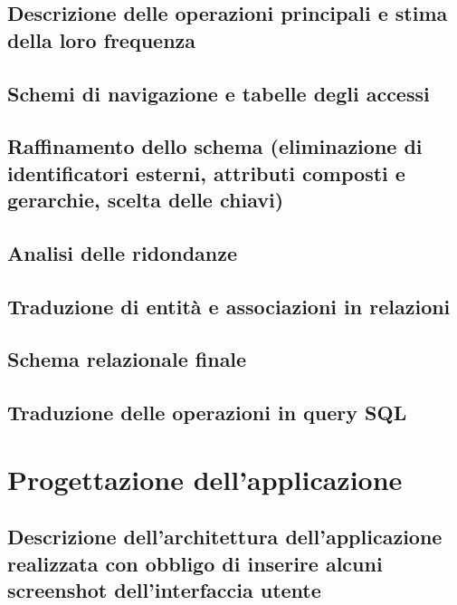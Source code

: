 \documentclass[a4paper,12pt]{report}
\begin{document}
\section{Descrizione delle operazioni principali e stima della loro frequenza}
\section{Schemi di navigazione e tabelle degli accessi}
\section{Raffinamento dello schema (eliminazione di identificatori esterni, attributi composti e gerarchie, scelta delle chiavi)}
\section{Analisi delle ridondanze}
\section{Traduzione di entità e associazioni in relazioni}
\section{Schema relazionale finale}
\section{Traduzione delle operazioni in query SQL}
\chapter{Progettazione dell'applicazione}
\section{Descrizione dell'architettura dell'applicazione realizzata con obbligo di inserire alcuni screenshot dell'interfaccia utente}
\end{document}
